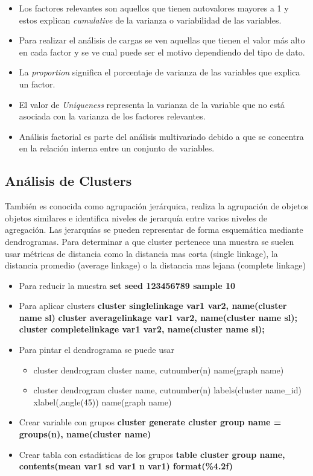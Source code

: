 \begin{itemize}
	\item Los factores relevantes son aquellos que tienen autovalores mayores a 1 y estos explican \textit{cumulative} de la varianza o variabilidad de las variables.
	\item Para realizar el análisis de cargas se ven aquellas que tienen el valor más alto en cada factor y se ve cual puede ser el motivo dependiendo del tipo de dato. 
	\item La \textit{proportion} significa el porcentaje de varianza de las variables que explica un factor.
	\item El valor de \textit{Uniqueness} representa la varianza de la variable que no está asociada con la varianza de los factores relevantes.
	\item Análisis factorial es parte del análisis multivariado debido a que se concentra en la relación interna entre un conjunto de variables.
\end{itemize}

\subsection{Análisis de Clusters}

También es conocida como agrupación jerárquica, realiza la agrupación de objetos objetos similares e identifica niveles de jerarquía entre varios niveles de agregación. Las jerarquías se pueden representar de forma esquemática mediante dendrogramas. Para determinar a que cluster pertenece una muestra se suelen usar métricas de distancia como la distancia mas corta (single linkage), la distancia promedio (average linkage) o la distancia mas lejana (complete linkage)

\begin{itemize}
	\item Para reducir la muestra \textbf{set seed 123456789
		sample 10}
	\item Para aplicar clusters \textbf{cluster singlelinkage var1 var2, name(cluster name sl)} \textbf{cluster averagelinkage var1 var2, name(cluster name sl);} \textbf{cluster completelinkage var1 var2, name(cluster name sl);}
	\item Para pintar el dendrograma se puede usar 
	\begin{itemize}
		\item cluster dendrogram cluster name, cutnumber(n)  name(graph name)
		\item cluster dendrogram cluster name, cutnumber(n) labels(cluster name\_id) xlabel(,angle(45)) name(graph name)
	\end{itemize}
	\item Crear variable con grupos \textbf{cluster generate cluster group name = groups(n), name(cluster name)}
	\item Crear tabla con estadísticas de los grupos \textbf{table cluster group name, contents(mean var1 sd var1 n var1) format(\%4.2f)}
\end{itemize}

